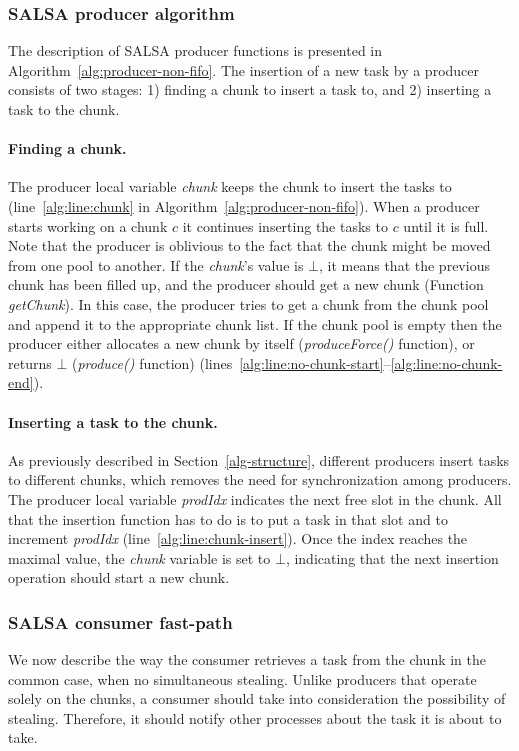 \subsubsection {SALSA producer algorithm}

The description of SALSA producer functions is presented in Algorithm~\ref{alg:producer-non-fifo}. 
The insertion of a new task by a producer consists of two stages: 
1) finding a chunk to insert a task to, and 2) inserting a task to the chunk. 

\paragraph {Finding a chunk.}
The producer local variable \emph{chunk} keeps the chunk to insert the tasks to (line~\ref{alg:line:chunk} in Algorithm~\ref{alg:producer-non-fifo}). 
When a producer starts working on a chunk $c$ it continues inserting the tasks to $c$ until it is full. 
Note that the producer is oblivious to the fact that the chunk might be moved from one pool to another.
If the \emph{chunk}'s value is $\bot$, it means that the previous chunk has been filled up, and the producer should get a new chunk (Function \emph{getChunk}). 
In this case, the producer tries to get a chunk from the chunk pool and append it to the appropriate chunk list. If the chunk pool is empty then the producer either allocates a new chunk by itself (\emph{produceForce()} function), or returns $\bot$ (\emph{produce()} function) (lines~\ref{alg:line:no-chunk-start}--\ref{alg:line:no-chunk-end}). 

\paragraph {Inserting a task to the chunk.}
As previously described in Section~\ref{alg-structure}, different producers insert tasks to different chunks, which removes the need for synchronization among producers. 
The producer local variable \emph{prodIdx} indicates the next free slot in the chunk.
All that the insertion function has to do is to put a task in that slot and to increment \emph{prodIdx} (line~\ref{alg:line:chunk-insert}).
Once the index reaches the maximal value, the \emph{chunk} variable is set to $\bot$, indicating that the next insertion operation should start a new chunk. 

\subsubsection {SALSA consumer fast-path}

We now describe the way the consumer retrieves a task from the chunk in the common case, when no simultaneous stealing. 
Unlike producers that operate solely on the chunks, a consumer should take into consideration the possibility of stealing. 
Therefore, it should notify other processes about the task it is about to take. 

